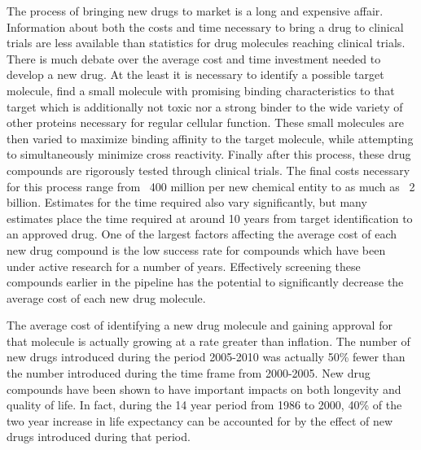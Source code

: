 The process of bringing new drugs to market is a long and expensive affair.
Information about both the costs and time necessary to bring a drug to clinical trials are less available than statistics for drug molecules reaching clinical trials.
There is much debate over the average cost and time investment needed to develop a new drug.
At the least it is necessary to identify a possible target molecule, find a small molecule with promising binding characteristics to that target which is additionally not toxic nor a strong binder to the wide variety of other proteins necessary for regular cellular function.
These small molecules are then varied to maximize binding affinity to the target molecule, while attempting to simultaneously minimize cross reactivity.
Finally after this process, these drug compounds are rigorously tested through clinical trials.
The final costs necessary for this process range from ~400 million per new chemical entity to as much as ~2 billion.
Estimates for the time required also vary significantly, but many estimates place the time required at around 10 years from target identification to an approved drug.
One of the largest factors affecting the average cost of each new drug compound is the low success rate for compounds which have been under active research for a number of years.
Effectively screening these compounds earlier in the pipeline has the potential to significantly decrease the average cost of each new drug molecule.
\cite{adams2006estimating}

The average cost of identifying a new drug molecule and gaining approval for that molecule is actually growing at a rate greater than inflation.
The number of new drugs introduced during the period 2005-2010 was actually 50\% fewer than the number introduced during the time frame from 2000-2005.
New drug compounds have been shown to have important impacts on both longevity and quality of life.
In fact, during the 14 year period from 1986 to 2000, 40\% of the two year increase in life expectancy can be accounted for by the effect of new drugs introduced during that period.
\cite{paul2010improve}

